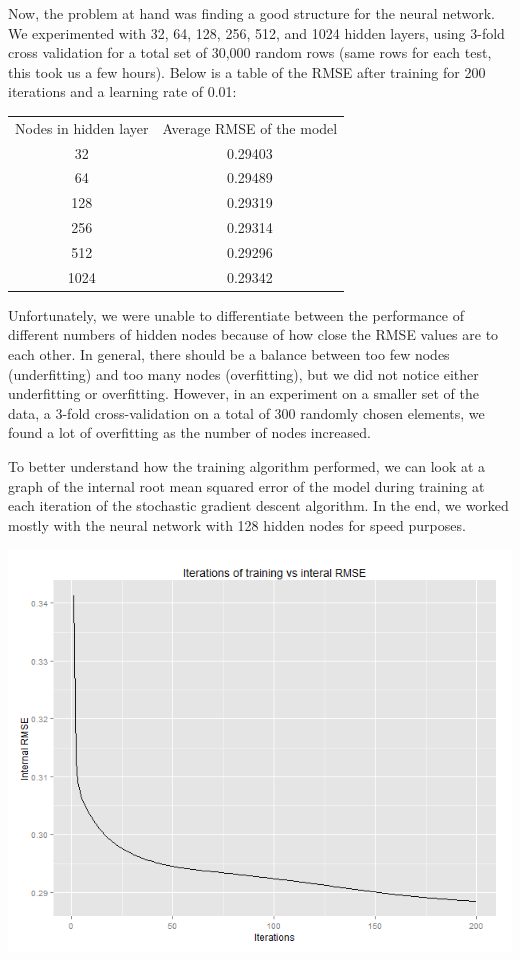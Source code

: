 \documentclass{article}
\begin{document}
Now, the problem at hand was finding a good structure for the neural network. 
 We experimented with 
32, 64, 128, 256, 512, and 1024 hidden layers, using 3-fold cross
validation for a total set of 30,000 random rows (same rows for each test,
this took us a few hours).
Below is a table of the RMSE after training for 200 iterations and
a learning rate of 0.01:

\begin{tabular}{ c | c }
  Nodes in hidden layer & Average RMSE of the model  \\
  32 & 0.29403  \\
  64 & 0.29489  \\
  128 & 0.29319 \\
  256 & 0.29314 \\
  512 & 0.29296 \\
  1024 & 0.29342 \\
\end{tabular}

Unfortunately, we were unable to differentiate between 
the performance of different numbers of hidden nodes because 
of how close the RMSE values are to each other.  In general,
there should be a balance between too few nodes (underfitting)
and too many nodes (overfitting), but we did not notice
either underfitting or overfitting.  However, in an experiment
on a smaller set of the data, a 3-fold cross-validation on a total of
300 randomly chosen elements, we found a lot of overfitting as the number of
nodes increased.

To better understand how the training algorithm performed,
we can look at a graph of the internal root mean squared error
of the model during training at each iteration of the stochastic
gradient descent algorithm.  In the end, we worked mostly with
the neural network with 128 hidden nodes for speed purposes.

\includegraphics[scale=0.5]{run128.png}
\end{document}
